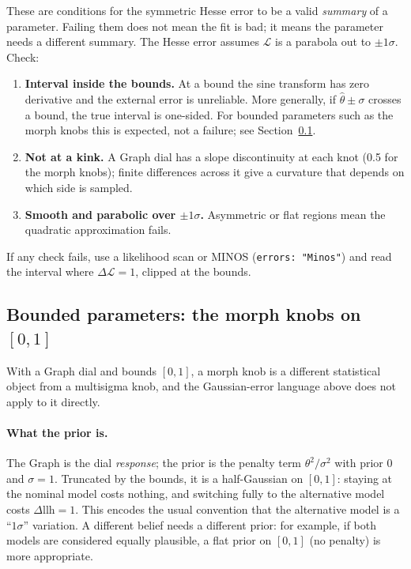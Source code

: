 \documentclass[11pt]{article}
\newcommand{\code}[1]{\texttt{#1}}
\begin{document}
These are conditions for the symmetric Hesse error to be a valid
\emph{summary} of a parameter. Failing them does not mean the fit is bad; it
means the parameter needs a different summary. The Hesse error assumes
$\mathcal{L}$ is a parabola out to $\pm1\sigma$. Check:
\begin{enumerate}
  \item \textbf{Interval inside the bounds.} At a bound the sine transform has
    zero derivative and the external error is unreliable. More generally, if
    $\hat\theta\pm\sigma$ crosses a bound, the true interval is one-sided. For
    bounded parameters such as the morph knobs this is expected, not a failure;
    see Section~\ref{sec:bounded}.
  \item \textbf{Not at a kink.} A Graph dial has a slope discontinuity at each
    knot (0.5 for the morph knobs); finite differences across it give a
    curvature that depends on which side is sampled.
  \item \textbf{Smooth and parabolic over $\pm1\sigma$.} Asymmetric or flat
    regions mean the quadratic approximation fails.
\end{enumerate}
If any check fails, use a likelihood scan or MINOS (\code{errors: "Minos"}) and
read the interval where $\Delta\mathcal{L}=1$, clipped at the bounds.

\subsection{Bounded parameters: the morph knobs on $[0,1]$}
\label{sec:bounded}

With a Graph dial and bounds $[0,1]$, a morph knob is a different statistical
object from a multisigma knob, and the Gaussian-error language above does not
apply to it directly.

\paragraph{What the prior is.} The Graph is the dial \emph{response}; the prior
is the penalty term $\theta^2/\sigma^2$ with prior 0 and $\sigma=1$. Truncated by
the bounds, it is a half-Gaussian on $[0,1]$: staying at the nominal model costs
nothing, and switching fully to the alternative model costs
$\Delta\text{llh}=1$. This encodes the usual convention that the alternative
model is a ``$1\sigma$'' variation. A different belief needs a different prior:
for example, if both models are considered equally plausible, a flat prior on
$[0,1]$ (no penalty) is more appropriate.
\end{document}
